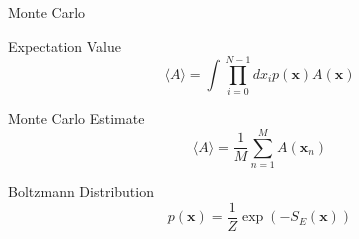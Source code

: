 \documentclass{beamer}
\begin{document}
    \begin{frame}{Monte Carlo}
        {
            \begin{block}{Expectation Value}
                {
                \begin{equation*}
                    \label{eq:MonteCarloEstimate}
                    \langle A \rangle = \int \prod_{i=0}^{N-1}{dx_i}p\left(\bm{x}\right)A\left(\bm{x}\right)
                \end{equation*}
                }
            \end{block}
        }
        {
            \begin{block}{Monte Carlo Estimate}
                {
                \begin{equation*}
                    \label{eq:MonteCarloEstimate}
                    \langle A \rangle = \frac{1}{M}\sum^{M}_{n = 1} A\left(\bm{x}_{n}\right)
                \end{equation*}
                }
            \end{block}
        }
        {
            \begin{block}{Boltzmann Distribution}
                {
                \begin{equation*}
                    \label{eq:BoltzmannDistribution}
                    p\left(\bm{x}\right)=\frac{1}{Z}\exp\left(-S_E\left(\bm{x}\right)\right)
                \end{equation*}
                }
            \end{block}
        }
    \end{frame}
\end{document}
